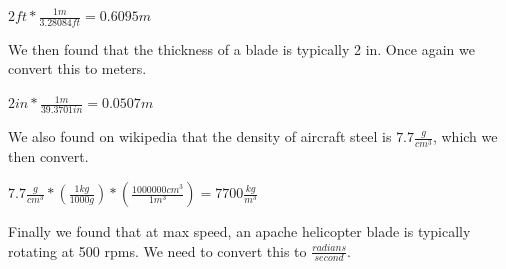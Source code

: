 \documentclass[a4paper, 11pt, oneside]{book} %
\begin{document}
\vspace{0.5\baselineskip} %
\vspace{0.5\baselineskip} %

$2ft * \frac{1m}{3.28084ft} = 0.6095m$\\

\vspace{0.5\baselineskip} %
\vspace{0.5\baselineskip} %

We then found that the thickness of a blade is typically 2 in. Once again we convert this to meters.\\

\vspace{0.5\baselineskip} %
\vspace{0.5\baselineskip} %

$2in * \frac{1m}{39.3701in} = 0.0507m$\\

\vspace{0.5\baselineskip} %
\vspace{0.5\baselineskip} %

We also found on wikipedia that the density of aircraft steel is $7.7 \frac{g}{cm^3}$, which we then convert.\\

\vspace{0.5\baselineskip} %
\vspace{0.5\baselineskip} %

$7.7\frac{g}{cm^3}*(\frac{1kg}{1000g})*(\frac{1000000cm^3}{1m^3}) = 7700\frac{kg}{m^3}$\\

\vspace{0.5\baselineskip} %
\vspace{0.5\baselineskip} %

Finally we found that at max speed, an apache helicopter blade is typically rotating at 500 rpms. We need to convert this to $\frac{radians}{second}$.\\

\vspace{0.5\baselineskip} %
\vspace{0.5\baselineskip} %
\end{document}
